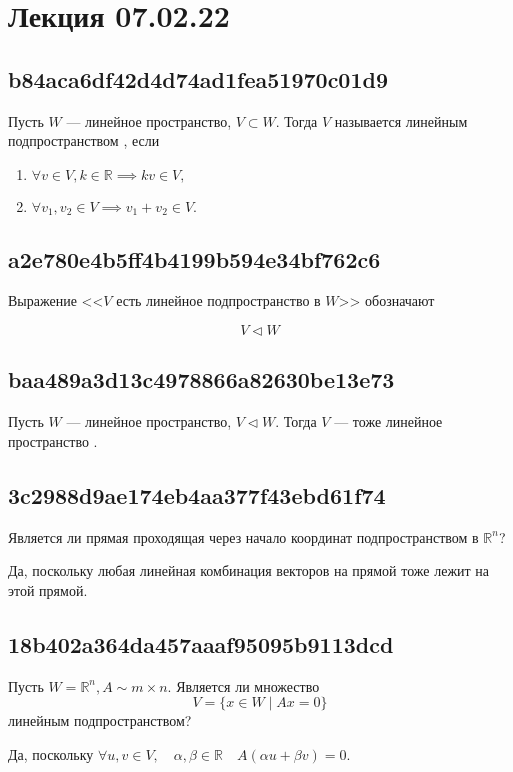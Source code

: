 \documentclass[11pt, a5paper]{article}
\let\oldsection\section
\renewcommand\section{\pagebreak\oldsection}
\newenvironment{note}[1]{\goodbreak\par\subsection{\hfill \color{lightgray}\tiny #1}}{}
\newenvironment{cloze}[2][\ldots]{\begin{leftbar}}{\end{leftbar}}
\newenvironment{icloze}[2][\ldots]{%
  \ignorespaces\text{\tiny \color{lightgray} \{\{c#2::}\hspace{0pt}%
}{%
  \hspace{0pt}\text{\tiny \color{lightgray}\}\}}\unskip%
}
\begin{document}
\section{Лекция 07.02.22}
\begin{note}{b84aca6df42d4d74ad1fea51970c01d9}
    Пусть \begin{icloze}{3}\( W \) --- линейное пространство, \( V \subset W. \) \end{icloze} Тогда \( V \) называется \begin{icloze}{2}линейным подпространством\end{icloze}, если
    \begin{icloze}{1}
        \begin{enumerate}
            \item \( \forall v \in V, k \in \mathbb R \implies kv \in V,  \)
            \item \( \forall v_1, v_2 \in V \implies v_1 + v_2 \in V. \)
        \end{enumerate}
    \end{icloze}
\end{note}

\begin{note}{a2e780e4b5ff4b4199b594e34bf762c6}
    Выражение <<\( V \) есть линейное подпространство в \( W \)>> обозначают
    \begin{icloze}{1}
        \[
            V \triangleleft W
        \]
    \end{icloze}
\end{note}

\begin{note}{baa489a3d13c4978866a82630be13e73}
    Пусть \( W \) --- линейное пространство, \( V \triangleleft W \). Тогда \( V \) --- \begin{icloze}{1}тоже линейное пространство\end{icloze}.
\end{note}

\begin{note}{3c2988d9ae174eb4aa377f43ebd61f74}
    Является ли прямая проходящая через начало координат подпространством в \( \mathbb R ^{n}  \)?

    \begin{cloze}{1}
        Да, поскольку любая линейная комбинация векторов на прямой тоже лежит на этой прямой.
    \end{cloze}
\end{note}

\begin{note}{18b402a364da457aaaf95095b9113dcd}
    Пусть \( W = \mathbb R ^{n}, A \sim m \times n. \)
    Является ли множество
    \[
        V = \{ x \in W \mid Ax = 0  \}
    \]
    линейным подпространством?

    \begin{cloze}{1}
        Да, поскольку \( \forall u, v \in V, \quad \alpha, \beta \in \mathbb R \quad A(\alpha u + \beta v) = 0. \)
    \end{cloze}
\end{note}
\end{document}
